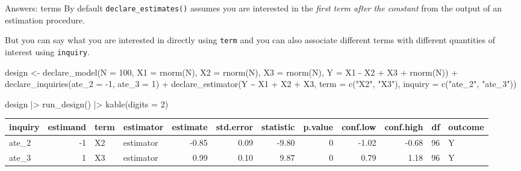 \documentclass[
  11pt,
  ignorenonframetext,
]{beamer}
\newenvironment{Shaded}{\begin{snugshade}}{\end{snugshade}}
\newcommand{\AttributeTok}[1]{\textcolor[rgb]{0.40,0.45,0.13}{#1}}
\newcommand{\DecValTok}[1]{\textcolor[rgb]{0.68,0.00,0.00}{#1}}
\newcommand{\FunctionTok}[1]{\textcolor[rgb]{0.28,0.35,0.67}{#1}}
\newcommand{\NormalTok}[1]{\textcolor[rgb]{0.00,0.23,0.31}{#1}}
\newcommand{\OtherTok}[1]{\textcolor[rgb]{0.00,0.23,0.31}{#1}}
\newcommand{\SpecialCharTok}[1]{\textcolor[rgb]{0.37,0.37,0.37}{#1}}
\newcommand{\StringTok}[1]{\textcolor[rgb]{0.13,0.47,0.30}{#1}}
\begin{document}
\begin{frame}[fragile]{Answers: terms}
\protect\hypertarget{answers-terms}{}
By default \texttt{declare\_estimates()} assumes you are interested in
the \emph{first term after the constant} from the output of an
estimation procedure.

But you can say what you are interested in directly using \texttt{term}
and you can also associate different terms with different quantities of
interest using \texttt{inquiry}.

\begin{Shaded}
\begin{Highlighting}[]
\NormalTok{design }\OtherTok{\textless{}{-}}
  \FunctionTok{declare\_model}\NormalTok{(}\AttributeTok{N =} \DecValTok{100}\NormalTok{,}
                \AttributeTok{X1 =} \FunctionTok{rnorm}\NormalTok{(N),}
                \AttributeTok{X2 =} \FunctionTok{rnorm}\NormalTok{(N),}
                \AttributeTok{X3 =} \FunctionTok{rnorm}\NormalTok{(N),}
                \AttributeTok{Y =}\NormalTok{ X1 }\SpecialCharTok{{-}}\NormalTok{ X2 }\SpecialCharTok{+}\NormalTok{ X3 }\SpecialCharTok{+} \FunctionTok{rnorm}\NormalTok{(N)) }\SpecialCharTok{+}
  \FunctionTok{declare\_inquiries}\NormalTok{(}\AttributeTok{ate\_2 =} \SpecialCharTok{{-}}\DecValTok{1}\NormalTok{, }\AttributeTok{ate\_3 =} \DecValTok{1}\NormalTok{) }\SpecialCharTok{+}
  \FunctionTok{declare\_estimator}\NormalTok{(Y }\SpecialCharTok{\textasciitilde{}}\NormalTok{ X1 }\SpecialCharTok{+}\NormalTok{ X2 }\SpecialCharTok{+}\NormalTok{ X3, }\AttributeTok{term =} \FunctionTok{c}\NormalTok{(}\StringTok{"X2"}\NormalTok{, }\StringTok{"X3"}\NormalTok{), }\AttributeTok{inquiry =} \FunctionTok{c}\NormalTok{(}\StringTok{"ate\_2"}\NormalTok{, }\StringTok{"ate\_3"}\NormalTok{))}

\NormalTok{design  }\SpecialCharTok{|\textgreater{}} \FunctionTok{run\_design}\NormalTok{()  }\SpecialCharTok{|\textgreater{}} \FunctionTok{kable}\NormalTok{(}\AttributeTok{digits =} \DecValTok{2}\NormalTok{)}
\end{Highlighting}
\end{Shaded}

\begin{tabular}{l|r|l|l|r|r|r|r|r|r|r|l}
\hline
inquiry & estimand & term & estimator & estimate & std.error & statistic & p.value & conf.low & conf.high & df & outcome\\
\hline
ate\_2 & -1 & X2 & estimator & -0.85 & 0.09 & -9.80 & 0 & -1.02 & -0.68 & 96 & Y\\
\hline
ate\_3 & 1 & X3 & estimator & 0.99 & 0.10 & 9.87 & 0 & 0.79 & 1.18 & 96 & Y\\
\hline
\end{tabular}
\end{frame}
\end{document}
